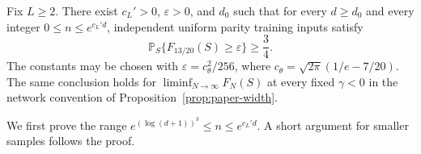 \begin{theorem}
\label{thm:all-n-gaussian}
Fix $L\ge2$. There exist $c_L'>0$, $\varepsilon>0$, and $d_0$ such
that for every $d\ge d_0$ and every integer $0\le n\le e^{c_L'd}$,
independent uniform parity training inputs satisfy
\[
 \mathbb P_S\{F_{13/20}(S)\ge\varepsilon\}\ge\frac34.
\]
The constants may be chosen with
$\varepsilon=c_\theta^2/256$, where
$c_\theta=\sqrt{2\pi}(1/e-7/20)$. The same conclusion holds for
$\liminf_{N\to\infty}F_N(S)$ at every fixed $\gamma<0$ in the
network convention of Proposition~\ref{prop:paper-width}.
\end{theorem}

We first prove the range $e^{(\log(d+1))^3}\le n\le e^{c_L'd}$.
A short argument for smaller samples follows the proof.

